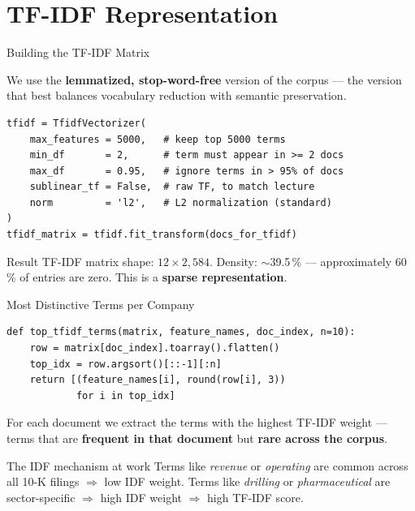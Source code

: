\documentclass[aspectratio=169,11pt]{beamer}
\begin{document}
\section{TF-IDF Representation}

\begin{frame}[fragile]{Building the TF-IDF Matrix}

We use the \textbf{lemmatized, stop-word-free} version of the
corpus --- the version that best balances vocabulary reduction
with semantic preservation.

\begin{lstlisting}
tfidf = TfidfVectorizer(
    max_features = 5000,   # keep top 5000 terms
    min_df       = 2,      # term must appear in >= 2 docs
    max_df       = 0.95,   # ignore terms in > 95% of docs
    sublinear_tf = False,  # raw TF, to match lecture
    norm         = 'l2',   # L2 normalization (standard)
)
tfidf_matrix = tfidf.fit_transform(docs_for_tfidf)
\end{lstlisting}

\vspace{6pt}
\begin{block}{Result}
TF-IDF matrix shape: $12 \times 2{,}584$.
Density: $\sim$39.5\,\% --- approximately 60\,\% of entries
are zero. This is a \textbf{sparse representation}.
\end{block}

\end{frame}

\begin{frame}[fragile]{Most Distinctive Terms per Company}

\begin{lstlisting}
def top_tfidf_terms(matrix, feature_names, doc_index, n=10):
    row = matrix[doc_index].toarray().flatten()
    top_idx = row.argsort()[::-1][:n]
    return [(feature_names[i], round(row[i], 3))
            for i in top_idx]
\end{lstlisting}

\vspace{6pt}
For each document we extract the terms with the highest
TF-IDF weight --- terms that are \textbf{frequent in that
document} but \textbf{rare across the corpus}.

\vspace{6pt}
\begin{block}{The IDF mechanism at work}
Terms like \emph{revenue} or \emph{operating} are common
across all 10-K filings $\Rightarrow$ low IDF weight.
Terms like \emph{drilling} or \emph{pharmaceutical} are
sector-specific $\Rightarrow$ high IDF weight
$\Rightarrow$ high TF-IDF score.
\end{block}

\end{frame}
\end{document}
